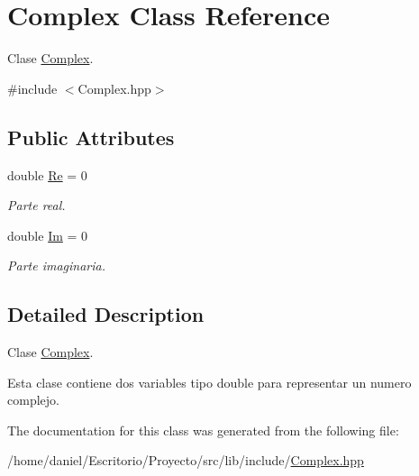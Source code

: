 \hypertarget{classComplex}{}\section{Complex Class Reference}
\label{classComplex}


Clase \hyperlink{classComplex}{Complex}.  




{\ttfamily \#include $<$Complex.\+hpp$>$}

\subsection*{Public Attributes}
\begin{DoxyCompactItemize}
\item 
\mbox{\label{classComplex_aed0f7f2a72da406620581d863a6dc333}} 
double \hyperlink{classComplex_aed0f7f2a72da406620581d863a6dc333}{Re} = 0
\begin{DoxyCompactList}\small\item\em Parte real. \end{DoxyCompactList}\item 
\mbox{\label{classComplex_a25938efdb07e8d21e4a07392a3494e0b}} 
double \hyperlink{classComplex_a25938efdb07e8d21e4a07392a3494e0b}{Im} = 0
\begin{DoxyCompactList}\small\item\em Parte imaginaria. \end{DoxyCompactList}\end{DoxyCompactItemize}


\subsection{Detailed Description}
Clase \hyperlink{classComplex}{Complex}. 

Esta clase contiene dos variables tipo double para representar un numero complejo. 

The documentation for this class was generated from the following file\+:\begin{DoxyCompactItemize}
\item 
/home/daniel/\+Escritorio/\+Proyecto/src/lib/include/\hyperlink{Complex_8hpp}{Complex.\+hpp}\end{DoxyCompactItemize}
